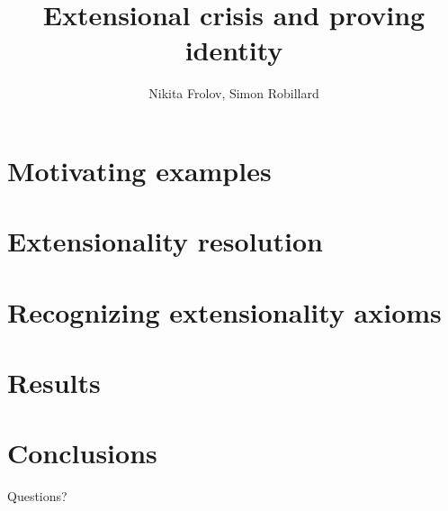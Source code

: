 \documentclass[14pt]{beamer}
\title{Extensional crisis and proving identity}
\author{Nikita Frolov, Simon Robillard}
\institute{}
\date{}
\begin{document}
\begin{frame}
  \maketitle
\end{frame}

\section{Motivating examples}


\section{Extensionality resolution}


\section{Recognizing extensionality axioms}


\section{Results}


\section{Conclusions}


\begin{frame}
  \begin{center}
    \Huge{Questions?}
  \end{center}
\end{frame}
\end{document}
